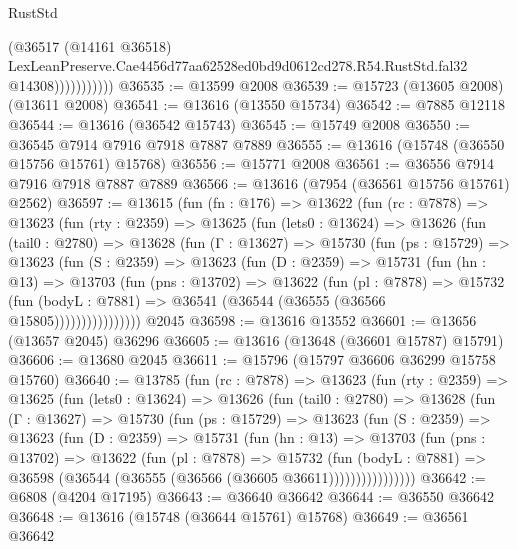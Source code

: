 \begin{lexlean}{RustStd}
\begin{coremodule}
                        (@36517
                          (@14161 @36518)
                          LexLeanPreserve.Cae4456d77aa62528ed0bd9d0612cd278.R54.RustStd.fal32
                          @14308)))))))))))
@36535 := @13599 @2008
@36539 := @15723 (@13605 @2008) (@13611 @2008)
@36541 := @13616 (@13550 @15734)
@36542 := @7885 @12118
@36544 := @13616 (@36542 @15743)
@36545 := @15749 @2008
@36550 := @36545 @7914 @7916 @7918 @7887 @7889
@36555 := @13616 (@15748 (@36550 @15756 @15761) @15768)
@36556 := @15771 @2008
@36561 := @36556 @7914 @7916 @7918 @7887 @7889
@36566 := @13616 (@7954 (@36561 @15756 @15761) @2562)
@36597 := @13615
    (fun (fn : @176) =>
    @13622
      (fun (rc : @7878) =>
      @13623
        (fun (rty : @2359) =>
        @13625
          (fun (lets0 : @13624) =>
          @13626
            (fun (tail0 : @2780) =>
            @13628
              (fun (Γ : @13627) =>
              @15730
                (fun (ps : @15729) =>
                @13623
                  (fun (S : @2359) =>
                  @13623
                    (fun (D : @2359) =>
                    @15731
                      (fun (hn : @13) =>
                      @13703
                        (fun (pns : @13702) =>
                        @13622
                          (fun (pl : @7878) =>
                          @15732
                            (fun (bodyL : @7881) =>
                            @36541 (@36544 (@36555 (@36566 @15805))))))))))))))))
    @2045
@36598 := @13616 @13552
@36601 := @13656 (@13657 @2045) @36296
@36605 := @13616 (@13648 (@36601 @15787) @15791)
@36606 := @13680 @2045
@36611 := @15796 (@15797 @36606 @36299 @15758 @15760)
@36640 := @13785
    (fun (rc : @7878) =>
    @13623
      (fun (rty : @2359) =>
      @13625
        (fun (lets0 : @13624) =>
        @13626
          (fun (tail0 : @2780) =>
          @13628
            (fun (Γ : @13627) =>
            @15730
              (fun (ps : @15729) =>
              @13623
                (fun (S : @2359) =>
                @13623
                  (fun (D : @2359) =>
                  @15731
                    (fun (hn : @13) =>
                    @13703
                      (fun (pns : @13702) =>
                      @13622
                        (fun (pl : @7878) =>
                        @15732
                          (fun (bodyL : @7881) =>
                          @36598 (@36544 (@36555 (@36566 (@36605 @36611))))))))))))))))
@36642 := @6808 (@4204 @17195)
@36643 := @36640 @36642
@36644 := @36550 @36642
@36648 := @13616 (@15748 (@36644 @15761) @15768)
@36649 := @36561 @36642

\end{coremodule}
\end{lexlean}
